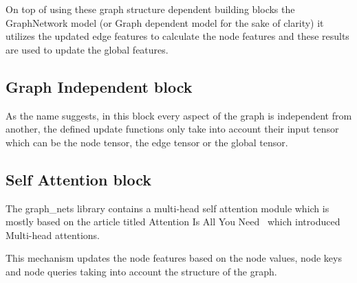 
On top of using these graph structure dependent building blocks the GraphNetwork model (or Graph dependent model for the sake of clarity) it utilizes the updated edge features to calculate the node features and these results are used to update the global features.

\subsection{Graph Independent block}
As the name suggests, in this block every aspect of the graph is independent from another, the defined update functions only take into account their input tensor which can be the node tensor, the edge tensor or the global tensor.

\subsection{Self Attention block}
The graph\_nets library contains a multi-head self attention module which is mostly based on the article titled Attention Is All You Need~\cite{Multihead} which introduced Multi-head attentions.

This mechanism updates the node features based on the node values, node keys and node queries taking into account the structure of the graph.
